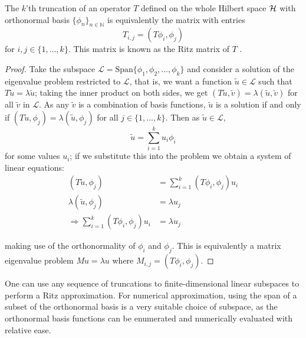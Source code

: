 \documentclass[../main.tex]{subfiles}
\begin{document}
\begin{proposition}
\label{thm:ritz-method}
  The $k$'th truncation of an operator $T$ defined on the whole Hilbert space
  $\mathcal{H}$ with orthonormal basis $\{\phi_n\}_{n \in \mathbb{N}}$ 
  is equivalently the matrix with entries
    $$T_{i,j} = (T\phi_i, \phi_j)$$
  for $i, j \in \{1, \hdots, k\}$.
  This matrix is known as the Ritz matrix of $T$ \cite{davies2003spectral}.
\end{proposition}
\begin{proof}
Take the subspace $\mathcal{L} = \text{Span}\{\phi_1, \phi_2, \hdots, \phi_k\}$ and
consider a solution
of the eigenvalue problem restricted to $\mathcal{L}$, that is, we want a function
$\tilde{u} \in \mathcal{L}$ such that $T\tilde{u} = \lambda\tilde{u}$; taking the inner
product on both sides, we get 
$(T\tilde{u}, \tilde{v}) = \lambda (\tilde{u}, \tilde{v})$ for all $\tilde{v}$
in $\mathcal{L}$. As any $\tilde{v}$ is a combination of basis functions, $\tilde{u}$
is a solution if and only if
$(T\tilde{u}, \phi_j) = \lambda (\tilde{u}, \phi_j)$ for all $j \in
\{1, \hdots, k\}$. Then as $\tilde{u} \in \mathcal{L},$ 
$$\tilde{u} = \sum_{i=1}^k u_i \phi_i$$
for some values $u_i$; if we substitute this into the problem we obtain a system
of linear equations:
\begin{align*}
  (T\tilde{u}, \phi_j) & = \sum_{i=1}^k (T\phi_i, \phi_j) u_i \\
  \lambda (\tilde{u}, \phi_j) & = \lambda u_j \\
  \Rightarrow \sum_{i=1}^k (T\phi_i, \phi_j) u_i & = \lambda u_j
\end{align*}

making use of the orthonormality of $\phi_i$ and $\phi_j$. This is equivalently
a matrix eigenvalue problem $M u = \lambda u$ where $M_{i,j} = (T\phi_i, \phi_j)$.
\end{proof}

One can use any sequence of truncations to finite-dimensional linear subspaces
to perform a Ritz approximation. For numerical approximation, using the span of
a subset of the orthonormal basis is a very suitable choice of subspace, as the
orthonormal basis functions can be enumerated and numerically evaluated with relative ease.
\end{document}
